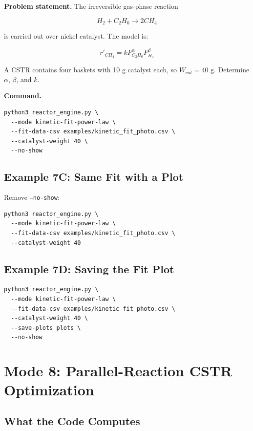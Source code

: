 \documentclass[11pt]{article}
\begin{document}
\textbf{Problem statement.} The irreversible gas-phase reaction

\begin{equation}
H_2 + C_2H_6 \to 2CH_4
\end{equation}

is carried out over nickel catalyst. The model is:

\begin{equation}
r'_{CH_4}=kP_{C_2H_6}^{\alpha}P_{H_2}^{\beta}
\end{equation}

A CSTR contains four baskets with 10 g catalyst each, so $W_{cat}=40$ g. Determine $\alpha$, $\beta$, and $k$.

\textbf{Command.}

\begin{lstlisting}
python3 reactor_engine.py \
  --mode kinetic-fit-power-law \
  --fit-data-csv examples/kinetic_fit_photo.csv \
  --catalyst-weight 40 \
  --no-show
\end{lstlisting}

\subsection{Example 7C: Same Fit with a Plot}

Remove \texttt{--no-show}:

\begin{lstlisting}
python3 reactor_engine.py \
  --mode kinetic-fit-power-law \
  --fit-data-csv examples/kinetic_fit_photo.csv \
  --catalyst-weight 40
\end{lstlisting}

\subsection{Example 7D: Saving the Fit Plot}

\begin{lstlisting}
python3 reactor_engine.py \
  --mode kinetic-fit-power-law \
  --fit-data-csv examples/kinetic_fit_photo.csv \
  --catalyst-weight 40 \
  --save-plots plots \
  --no-show
\end{lstlisting}

\section{Mode 8: Parallel-Reaction CSTR Optimization}

\subsection{What the Code Computes}
\end{document}
